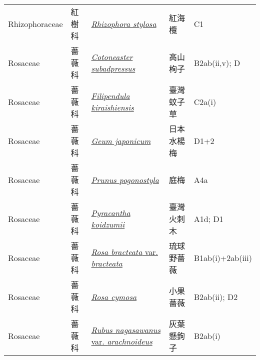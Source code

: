 {\begin{longtable}{p{2.5cm}p{2.5cm}p{4.5cm}p{2.5cm}p{3cm}}
    Rhizophoraceae & 紅樹科 & \href{http://www.theplantlist.org/tpl1.1/search?q=Rhizophora+stylosa}{\textit{Rhizophora stylosa} } & 紅海欖 & C1 \index{Rhizophora@\textit{Rhizophora}!stylosa@\textit{stylosa}}  \index{紅海欖} \\
    Rosaceae & 薔薇科 & \href{http://www.theplantlist.org/tpl1.1/search?q=Cotoneaster+subadpressus}{\textit{Cotoneaster subadpressus} } & 高山栒子 & B2ab(ii,v); D \index{Cotoneaster@\textit{Cotoneaster}!subadpressus@\textit{subadpressus}}  \index{高山栒子} \\
    Rosaceae & 薔薇科 & \href{http://www.theplantlist.org/tpl1.1/search?q=Filipendula+kiraishiensis}{\textit{Filipendula kiraishiensis} } & 臺灣蚊子草 & C2a(i) \index{Filipendula@\textit{Filipendula}!kiraishiensis@\textit{kiraishiensis}}  \index{臺灣蚊子草} \\
    Rosaceae & 薔薇科 & \href{http://www.theplantlist.org/tpl1.1/search?q=Geum+japonicum}{\textit{Geum japonicum} } & 日本水楊梅 & D1+2 \index{Geum@\textit{Geum}!japonicum@\textit{japonicum}}  \index{日本水楊梅} \\
    Rosaceae & 薔薇科 & \href{http://www.theplantlist.org/tpl1.1/search?q=Prunus+pogonostyla}{\textit{Prunus pogonostyla} } & 庭梅 & A4a \index{Prunus@\textit{Prunus}!pogonostyla@\textit{pogonostyla}}  \index{庭梅} \\
    Rosaceae & 薔薇科 & \href{http://www.theplantlist.org/tpl1.1/search?q=Pyracantha+koidzumii}{\textit{Pyracantha koidzumii} } & 臺灣火刺木 & A1d; D1 \index{Pyracantha@\textit{Pyracantha}!koidzumii@\textit{koidzumii}}  \index{臺灣火刺木} \\
    Rosaceae & 薔薇科 & \href{http://www.theplantlist.org/tpl1.1/search?q=Rosa+bracteata+var.+bracteata}{\textit{Rosa bracteata} var. \textit{bracteata} } & 琉球野薔薇 & B1ab(i)+2ab(iii) \index{Rosa@\textit{Rosa}!bracteata@\textit{bracteata}!var. bracteata@var. \textit{bracteata}}  \index{琉球野薔薇} \\
    Rosaceae & 薔薇科 & \href{http://www.theplantlist.org/tpl1.1/search?q=Rosa+cymosa}{\textit{Rosa cymosa} } & 小果薔薇 & B2ab(ii); D2 \index{Rosa@\textit{Rosa}!cymosa@\textit{cymosa}}  \index{小果薔薇} \\
    Rosaceae & 薔薇科 & \href{http://www.theplantlist.org/tpl1.1/search?q=Rubus+nagasawanus+var.+arachnoideus}{\textit{Rubus nagasawanus} var. \textit{arachnoideus} } & 灰葉懸鉤子 & B2ab(i) \index{Rubus@\textit{Rubus}!nagasawanus@\textit{nagasawanus}!var. arachnoideus@var. \textit{arachnoideus}}  \index{灰葉懸鉤子} \\

\end{longtable}}
